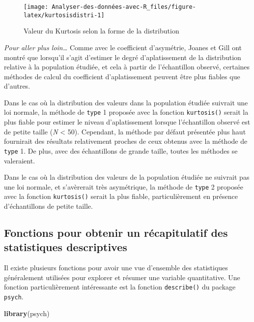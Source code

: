 \documentclass[
  french,
]{book}
\newenvironment{Shaded}{\begin{snugshade}}{\end{snugshade}}
\newcommand{\KeywordTok}[1]{\textcolor[rgb]{0.13,0.29,0.53}{\textbf{#1}}}
\newcommand{\NormalTok}[1]{#1}
\begin{document}
\begin{figure}

{\centering \texttt{[image: Analyser-des-données-avec-R\_files/figure-latex/kurtosisdistri-1]} 

}

\caption{Valeur du Kurtosis selon la forme de la distribution}\label{fig:kurtosisdistri}
\end{figure}

\emph{Pour aller plus loin\ldots{}}
Comme avec le coefficient d'asymétrie, Joanes et Gill \autocite*{joanesComparingMeasuresSample1998} ont montré que lorsqu'il s'agit d'estimer le degré d'aplatissement de la distribution relative à la population étudiée, et cela à partir de l'échantillon observé, certaines méthodes de calcul du coefficient d'aplatissement peuvent être plus fiables que d'autres.

Dans le cas où la distribution des valeurs dans la population étudiée suivrait une loi normale, la méthode de \texttt{type} 1 proposée avec la fonction \texttt{kurtosis()} serait la plus fiable pour estimer le niveau d'aplatissement lorsque l'échantillon observé est de petite taille (\emph{N} \textless{} 50). Cependant, la méthode par défaut présentée plus haut fournirait des résultats relativement proches de ceux obtenus avec la méthode de \texttt{type} 1. De plus, avec des échantillons de grande taille, toutes les méthodes se valeraient.

Dans le cas où la distribution des valeurs de la population étudiée ne suivrait pas une loi normale, et s'avèrerait très asymétrique, la méthode de \texttt{type} 2 proposée avec la fonction \texttt{kurtosis()} serait la plus fiable, particulièrement en présence d'échantillons de petite taille.

\hypertarget{fonctions-pour-obtenir-un-ruxe9capitulatif-des-statistiques-descriptives}{%
\subsection{Fonctions pour obtenir un récapitulatif des statistiques descriptives}\label{fonctions-pour-obtenir-un-ruxe9capitulatif-des-statistiques-descriptives}}

Il existe plusieurs fonctions pour avoir une vue d'ensemble des statistiques généralement utilisées pour explorer et résumer une variable quantitative. Une fonction particulièrement intéressante est la fonction \texttt{describe()} du package \texttt{psych}.

\begin{Shaded}
\begin{Highlighting}[]
\KeywordTok{library}\NormalTok{(psych)}
\end{Highlighting}
\end{Shaded}
\end{document}
